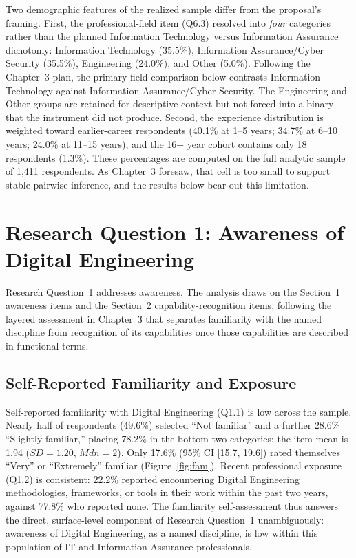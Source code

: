 Two demographic features of the realized sample differ from the proposal's framing. First, the professional-field item (Q6.3) resolved into \emph{four} categories rather than the planned Information Technology versus Information Assurance dichotomy: Information Technology (35.5\%), Information Assurance/Cyber Security (35.5\%), Engineering (24.0\%), and Other (5.0\%). Following the Chapter~3 plan, the primary field comparison below contrasts Information Technology against Information Assurance/Cyber Security. The Engineering and Other groups are retained for descriptive context but not forced into a binary that the instrument did not produce. Second, the experience distribution is weighted toward earlier-career respondents (40.1\% at 1--5 years; 34.7\% at 6--10 years; 24.0\% at 11--15 years), and the 16+ year cohort contains only 18 respondents (1.3\%). These percentages are computed on the full analytic sample of 1{,}411 respondents. As Chapter~3 foresaw, that cell is too small to support stable pairwise inference, and the results below bear out this limitation.

\section{Research Question 1: Awareness of Digital Engineering}

Research Question~1 addresses awareness. The analysis draws on the Section~1 awareness items and the Section~2 capability-recognition items, following the layered assessment in Chapter~3 that separates familiarity with the named discipline from recognition of its capabilities once those capabilities are described in functional terms.

\subsection{Self-Reported Familiarity and Exposure}

Self-reported familiarity with Digital Engineering (Q1.1) is low across the sample. Nearly half of respondents (49.6\%) selected ``Not familiar'' and a further 28.6\% ``Slightly familiar,'' placing 78.2\% in the bottom two categories; the item mean is 1.94 ($SD=1.20$, $Mdn=2$). Only 17.6\% (95\% CI [15.7, 19.6]) rated themselves ``Very'' or ``Extremely'' familiar (Figure~\ref{fig:fam}). Recent professional exposure (Q1.2) is consistent: 22.2\% reported encountering Digital Engineering methodologies, frameworks, or tools in their work within the past two years, against 77.8\% who reported none. The familiarity self-assessment thus answers the direct, surface-level component of Research Question~1 unambiguously: awareness of Digital Engineering, as a named discipline, is low within this population of IT and Information Assurance professionals.

